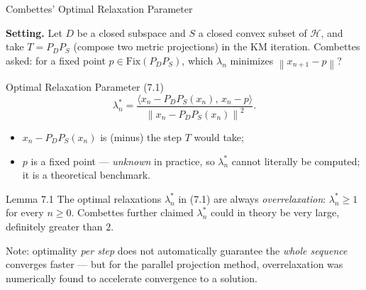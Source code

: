 \documentclass[aspectratio=169,10pt]{beamer}
\newcommand{\mHH}{\mathcal H}
\newcommand{\inner}[2]{\langle #1, #2 \rangle}
\newcommand{\norm}[1]{\left\|#1\right\|}
\newcommand{\Fix}{\mathrm{Fix}}
\begin{document}
\begin{frame}{Combettes' Optimal Relaxation Parameter}

  \textbf{Setting.} Let $D$ be a closed subspace and $S$ a closed
  convex subset of $\mHH$, and take $T=P_DP_S$ (compose two metric
  projections) in the KM iteration. Combettes asked: for a fixed
  point $p\in\Fix(P_DP_S)$, which $\lambda_n$ minimizes
  $\norm{x_{n+1}-p}$?

  \begin{block}{Optimal Relaxation Parameter (7.1)}
    \[
      \lambda_n^* = \frac{\inner{x_n - P_DP_S(x_n)}{\,x_n-p}}
                          {\norm{x_n-P_DP_S(x_n)}^2}.
    \]
    \begin{itemize}
      \item $x_n-P_DP_S(x_n)$ is (minus) the step $T$ would take;
      \item $p$ is a fixed point --- \emph{unknown} in practice, so
            $\lambda_n^*$ cannot literally be computed; it is a
            theoretical benchmark.
    \end{itemize}
  \end{block}

  \begin{alertblock}{Lemma 7.1}
    The optimal relaxations $\lambda_n^*$ in (7.1) are always
    \emph{overrelaxation}: $\lambda_n^*\ge1$ for every $n\ge0$.
    Combettes further claimed $\lambda_n^*$ could in theory be very
    large, definitely greater than $2$.
  \end{alertblock}

  Note: optimality \emph{per step} does not automatically guarantee
  the \emph{whole sequence} converges faster --- but for the
  parallel projection method, overrelaxation was numerically found
  to accelerate convergence to a solution.

\end{frame}
\end{document}
